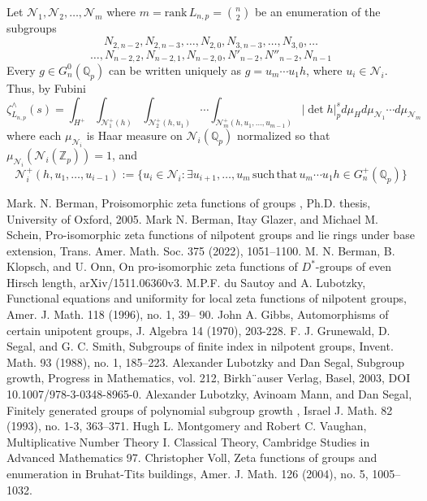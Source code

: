 \documentclass[12pt]{article}
\begin{document}
Let $\mathcal{N}_{1},\mathcal{N}_{2},\dots,\mathcal{N}_{m}$ where $m=\mathrm{rank}\,L_{n,p}=\binom{n}{2}$ be an enumeration of the subgroups
\[N_{2,n-2},N_{2,n-3},\dots,N_{2,0},N_{3,n-3},\dots,N_{3,0},\dots\]\[\dots,N_{n-2,2},N_{n-2,1},N_{n-2,0},N'_{n-2},N''_{n-2},N_{n-1}\]
Every $g\in{G_{n}^{0}(\mathbb{Q}_{p})}$ can be written uniquely as $g=u_{m}\cdots{u_{1}h}$, where $u_{i}\in{\mathcal{N}_{i}}$. Thus, by Fubini \[
\zeta_{L_{n,p}}^{\wedge}(s)=\displaystyle\int_{H^{+}}\displaystyle\int_{\mathcal{N}_{1}^{+}(h)}\displaystyle\int_{\mathcal{N}_{2}^{+}(h,u_{1})}\cdots\displaystyle\int_{\mathcal{N}_{m}^{+}(h,u_{1},\dots,u_{m-1})}|\det{h}|_{p}^{s}d\mu_{H}d\mu_{\mathcal{N}_{1}}\cdots{d\mu_{\mathcal{N}_{m}}}\]
where each $\mu_{\mathcal{N}_{i}}$ is Haar measure on $\mathcal{N}_{i}(\mathbb{Q}_{p})$ normalized so that $\mu_{\mathcal{N}_{i}}(\mathcal{N}_{i}(\mathbb{Z}_{p}))=1$, and \[\mathcal{N}_{i}^{+}(h,u_{1},\dots,u_{i-1}):=\{u_{i}\in\mathcal{N}_{i} : \exists{u_{i+1},\dots,u_{m}}\,\mathrm{such}\,\mathrm{that}\,u_{m}\cdots{u_{1}}h\in{G_{n}^{+}(\mathbb{Q}_{p})}\}\]
\begin{thebibliography}{2}
 Mark. N. Berman,
Proisomorphic zeta functions of groups
, Ph.D. thesis, University of Oxford,
2005.
 Mark N. Berman, Itay Glazer, and Michael M. Schein, Pro-isomorphic zeta functions of nilpotent groups and lie rings under base extension, Trans. Amer. Math. Soc. 375 (2022), 1051–1100.
 M. N. Berman, B. Klopsch, and U. Onn,
On pro-isomorphic zeta functions of $D^{\ast}$-groups of even Hirsch length, arXiv/1511.06360v3.
 M.P.F. du Sautoy and A. Lubotzky, Functional equations and uniformity for
local zeta functions of nilpotent groups, Amer. J. Math. 118 (1996), no. 1, 39–
90.
 John A. Gibbs, Automorphisms of certain unipotent groups, J. Algebra 14 (1970), 203-228.
 F. J. Grunewald, D. Segal, and G. C. Smith, Subgroups of finite index in nilpotent groups,
Invent. Math. 93 (1988), no. 1, 185–223.
Alexander Lubotzky and Dan Segal, Subgroup growth, Progress in Mathematics, vol. 212,
 Birkh¨auser Verlag, Basel, 2003, DOI 10.1007/978-3-0348-8965-0.
 Alexander Lubotzky, Avinoam Mann, and Dan Segal,
Finitely generated groups of polynomial
subgroup growth
, Israel J. Math.
82
(1993), no. 1-3, 363–371.
 Hugh L. Montgomery and Robert C. Vaughan, Multiplicative Number Theory I. Classical Theory, Cambridge Studies in Advanced Mathematics 97.
Christopher Voll, Zeta functions of groups and enumeration in Bruhat-Tits buildings, Amer.
J. Math. 126 (2004), no. 5, 1005–1032.
\end{thebibliography}
\end{document}

